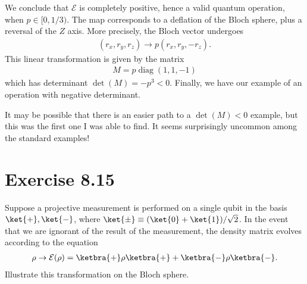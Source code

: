 \documentclass{book}
\DeclareMathOperator{\diag}{diag}
\begin{document}
    We conclude that $\mathcal{E}$ is completely positive, hence a valid quantum operation, when $p \in [0,1/3)$. The map corresponds to a deflation of the Bloch sphere, plus a reversal of the $Z$ axis. More precisely, the Bloch vector undergoes
    \begin{align}
        (r_x, r_y, r_z) \rightarrow p (r_x, r_y, -r_z). 
    \end{align}
    This linear transformation is given by the matrix
    \begin{align}
        M = p \diag(1,1,-1)
    \end{align}
    which has determinant $\det(M) = -p^3 < 0$. Finally, we have our example of an operation with negative determinant.

    It may be possible that there is an easier path to a $\det(M) < 0$ example, but this was the first one I was able to find. It seems surprisingly uncommon among the standard examples!

\section*{Exercise 8.15}
    Suppose a projective measurement is performed on a single qubit in the basis $\ket{+}, \ket{-}$, where $\ket{\pm} \equiv (\ket{0} + \ket{1})/\sqrt{2}$. In the event that we are ignorant of the result of the measurement, the density matrix evolves according to the equation
    \begin{align}
        \rho \rightarrow \mathcal{E}(\rho) = \ketbra{+}\rho\ketbra{+} + \ketbra{-}\rho \ketbra{-}.
    \end{align}
    Illustrate this transformation on the Bloch sphere.
\end{document}
